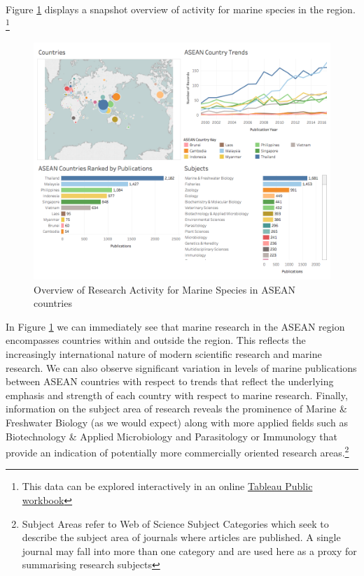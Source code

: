 \documentclass[]{book}
\theoremstyle{definition}
\theoremstyle{definition}
\theoremstyle{definition}
\theoremstyle{remark}
\begin{document}
Figure \ref{fig:marineres} displays a snapshot overview of activity for
marine species in the region. \footnote{This data can be explored
  interactively in an online \href{link}{Tableau Public workbook}}

\begin{figure}

{\centering \includegraphics[width=1\linewidth]{images/aseanmarinlit_overview} 

}

\caption{Overview of Research Activity for Marine Species in ASEAN countries}\label{fig:marineres}
\end{figure}

In Figure \ref{fig:marineres} we can immediately see that marine
research in the ASEAN region encompasses countries within and outside
the region. This reflects the increasingly international nature of
modern scientific research and marine research. We can also observe
significant variation in levels of marine publications between ASEAN
countries with respect to trends that reflect the underlying emphasis
and strength of each country with respect to marine research. Finally,
information on the subject area of research reveals the prominence of
Marine \& Freshwater Biology (as we would expect) along with more
applied fields such as Biotechnology \& Applied Microbiology and
Parasitology or Immunology that provide an indication of potentially
more commercially oriented research areas.\footnote{Subject Areas refer
  to Web of Science Subject Categories which seek to describe the
  subject area of journals where articles are published. A single
  journal may fall into more than one category and are used here as a
  proxy for summarising research subjects}
\end{document}
